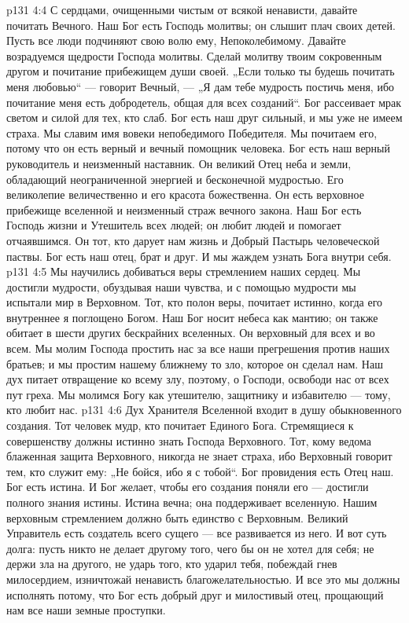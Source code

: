 \vs p131 4:4 С сердцами, очищенными чистым от всякой ненависти, давайте почитать Вечного. Наш Бог есть Господь молитвы; он слышит плач своих детей. Пусть все люди подчиняют свою волю ему, Непоколебимому. Давайте возрадуемся щедрости Господа молитвы. Сделай молитву твоим сокровенным другом и почитание прибежищем души своей. „Если только ты будешь почитать меня любовью“ --- говорит Вечный, --- „Я дам тебе мудрость постичь меня, ибо почитание меня есть добродетель, общая для всех созданий“. Бог рассеивает мрак светом и силой для тех, кто слаб. Бог есть наш друг сильный, и мы уже не имеем страха. Мы славим имя вовеки непобедимого Победителя. Мы почитаем его, потому что он есть верный и вечный помощник человека. Бог есть наш верный руководитель и неизменный наставник. Он великий Отец неба и земли, обладающий неограниченной энергией и бесконечной мудростью. Его великолепие величественно и его красота божественна. Он есть верховное прибежище вселенной и неизменный страж вечного закона. Наш Бог есть Господь жизни и Утешитель всех людей; он любит людей и помогает отчаявшимся. Он тот, кто дарует нам жизнь и Добрый Пастырь человеческой паствы. Бог есть наш отец, брат и друг. И мы жаждем узнать Бога внутри себя.
\vs p131 4:5 Мы научились добиваться веры стремлением наших сердец. Мы достигли мудрости, обуздывая наши чувства, и с помощью мудрости мы испытали мир в Верховном. Тот, кто полон веры, почитает истинно, когда его внутреннее я поглощено Богом. Наш Бог носит небеса как мантию; он также обитает в шести других бескрайних вселенных. Он верховный для всех и во всем. Мы молим Господа простить нас за все наши прегрешения против наших братьев; и мы простим нашему ближнему то зло, которое он сделал нам. Наш дух питает отвращение ко всему злу, поэтому, о Господи, освободи нас от всех пут греха. Мы молимся Богу как утешителю, защитнику и избавителю --- тому, кто любит нас.
\vs p131 4:6 Дух Хранителя Вселенной входит в душу обыкновенного создания. Тот человек мудр, кто почитает Единого Бога. Стремящиеся к совершенству должны истинно знать Господа Верховного. Тот, кому ведома блаженная защита Верховного, никогда не знает страха, ибо Верховный говорит тем, кто служит ему: „Не бойся, ибо я с тобой“. Бог провидения есть Отец наш. Бог есть истина. И Бог желает, чтобы его создания поняли его --- достигли полного знания истины. Истина вечна; она поддерживает вселенную. Нашим верховным стремлением должно быть единство с Верховным. Великий Управитель есть создатель всего сущего --- все развивается из него. И вот суть долга: пусть никто не делает другому того, чего бы он не хотел для себя; не держи зла на другого, не ударь того, кто ударил тебя, побеждай гнев милосердием, изничтожай ненависть благожелательностью. И все это мы должны исполнять потому, что Бог есть добрый друг и милостивый отец, прощающий нам все наши земные проступки.
